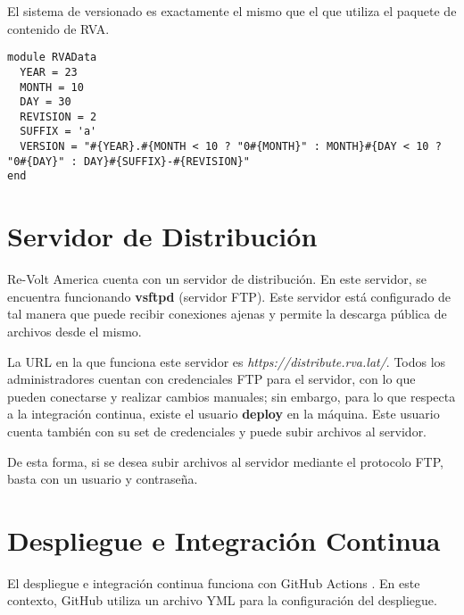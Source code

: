 El sistema de versionado es exactamente el mismo que el que utiliza el paquete de contenido de RVA.

\begin{longlisting}
  \begin{verbatim}  
module RVAData
  YEAR = 23
  MONTH = 10
  DAY = 30
  REVISION = 2
  SUFFIX = 'a'
  VERSION = "#{YEAR}.#{MONTH < 10 ? "0#{MONTH}" : MONTH}#{DAY < 10 ? "0#{DAY}" : DAY}#{SUFFIX}-#{REVISION}"
end
  \end{verbatim}
\end{longlisting}

\newpage

\section{Servidor de Distribución}
Re-Volt America cuenta con un servidor de distribución. En este servidor, se encuentra funcionando \textbf{vsftpd} (servidor FTP). Este servidor está configurado de tal manera que puede recibir conexiones ajenas y permite la descarga pública de archivos desde el mismo.

La URL en la que funciona este servidor es \textit{https://distribute.rva.lat/}. Todos los administradores cuentan con credenciales FTP para el servidor, con lo que pueden conectarse y realizar cambios manuales; sin embargo, para lo que respecta a la integración continua, existe el usuario \textbf{deploy} en la máquina. Este usuario cuenta también con su set de credenciales y puede subir archivos al servidor.

De esta forma, si se desea subir archivos al servidor mediante el protocolo FTP, basta con un usuario y contraseña.

\newpage

\section{Despliegue e Integración Continua}
El despliegue e integración continua funciona con GitHub Actions \cite{ghactions}. En este contexto, GitHub utiliza un archivo YML para la configuración del despliegue.


